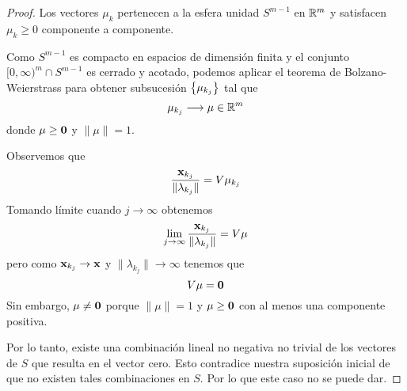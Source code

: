 \documentclass[a4paper,12pt]{article}
\begin{document}
\begin{proof}
    Los vectores $\mu_k$ pertenecen a la esfera unidad $S^{m-1}$ en $\mathbb{R}^m$ y satisfacen $\mu_k\geq 0$ componente a componente.

    Como $S^{m-1}$ es compacto en espacios de dimensión finita y el conjunto $[0,\infty)^m\cap S^{m-1}$ es cerrado y acotado, podemos aplicar el teorema de Bolzano-Weierstrass para obtener subsucesión $\left\lbrace\mu_{k_j}\right\rbrace$ tal que
    $$\mu_{k_j}\longrightarrow \mu\in \mathbb{R}^m $$
    donde $\mu\geq\mathbf{0}$ y $\|\mu\|=1$.

    Observemos que
    $$\frac{\mathbf{x}_{k_j}}{\|\lambda_{k_j}\|}=V\mu_{k_j}$$
    Tomando límite cuando $j\to\infty$ obtenemos
    $$\lim_{j\to\infty}\frac{\mathbf{x}_{k_j}}{\|\lambda_{k_j}\|}=V\mu$$
    pero como $\mathbf{x}_{k_j}\to\mathbf{x}$ y $\|\lambda_{k_j}\|\to\infty$ tenemos que
    $$V\mu=\mathbf{0}$$
    Sin embargo, $\mu\neq\mathbf{0}$ porque $\|\mu\|=1$ y $\mu\geq\mathbf{0}$ con al menos una componente positiva.

    Por lo tanto, existe una combinación lineal no negativa no trivial de los vectores de $S$ que resulta en el vector cero. Esto contradice nuestra suposición inicial de que no existen tales combinaciones en $S$. Por lo que este caso no se puede dar.
\end{proof}
\end{document}
